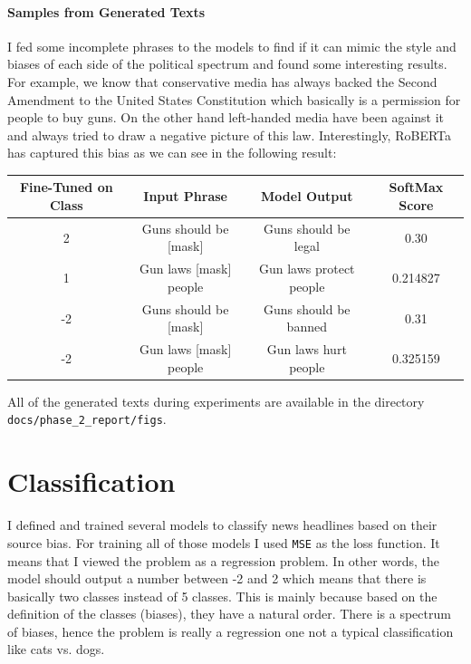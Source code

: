 \documentclass[11pt]{article}
\begin{document}
\paragraph{Samples from Generated Texts}
I fed some incomplete phrases to the models to find if it can mimic the style and biases of each side of the political spectrum and found some interesting results.
\newline
For example, we know that conservative media has always backed the Second Amendment to the United States Constitution which basically is a permission for people to buy guns. On the other hand left-handed media have been against it and always tried to draw a negative picture of this law.
Interestingly, RoBERTa has captured this bias as we can see in the following result:

\begin{center}
  \begin{tabular}{cccc}
    \hline
    \textbf{Fine-Tuned on Class} & \textbf{Input Phrase} & \textbf{Model Output} & \textbf{SoftMax Score} \\
    \hline
    \hline
    2 & Guns should be [mask] & Guns should be legal & 0.30 \\
    1 & Gun laws [mask] people & Gun laws protect people & 0.214827 \\
    -2 & Guns should be [mask] & Guns should be banned & 0.31 \\
    -2 & Gun laws [mask] people & Gun laws hurt people & 0.325159 \\
    \hline
  \end{tabular}
\end{center}

All of the generated texts during experiments are available in the directory \texttt{docs/phase\_2\_report/figs}.

\section{Classification}
I defined and trained several models to classify news headlines based on their source bias. For training all of those models I used \texttt{MSE} as the loss function. It means that I viewed the problem as a regression problem. In other words, the model should output a number between -2 and 2 which means that there is basically two classes instead of 5 classes. This is mainly because based on the definition of the classes (biases), they have a natural order. There is a spectrum of biases, hence the problem is really a regression one not a typical classification like cats vs. dogs.
\end{document}
